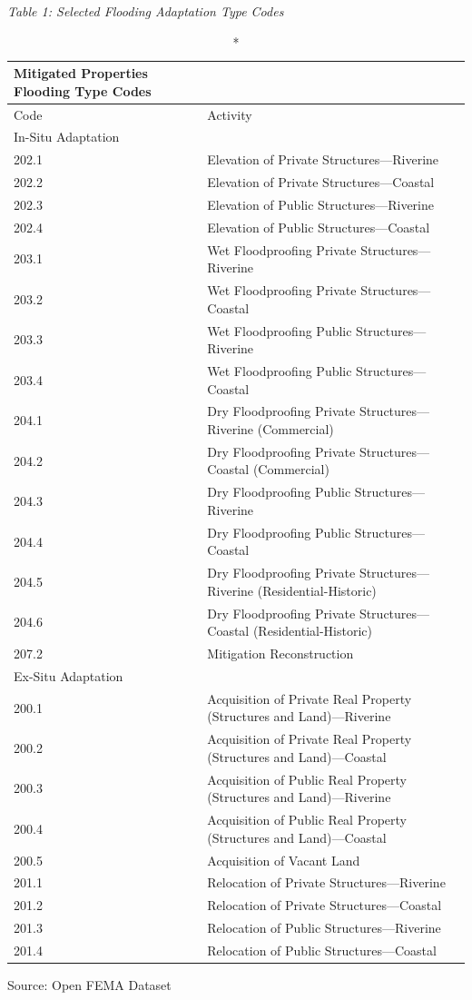 \documentclass[
  12pt,
]{article}
\begin{document}
\newpage

\emph{Table 1: Selected Flooding Adaptation Type Codes}

\captionsetup[table]{labelformat=empty,skip=1pt}
\setlength{\LTpost}{0mm}
\begin{longtable}{ll}
\caption*{
{\large Mitigated Properties Flooding Type Codes}
} \\ 
\toprule
Code & Activity \\ 
\midrule
\multicolumn{1}{l}{In-Situ Adaptation} \\ 
\midrule
202.1 & Elevation of Private Structures—Riverine \\ 
202.2 & Elevation of Private Structures—Coastal \\ 
202.3 & Elevation of Public Structures—Riverine \\ 
202.4 & Elevation of Public Structures—Coastal \\ 
203.1 & Wet Floodproofing Private Structures—Riverine \\ 
203.2 & Wet Floodproofing Private Structures—Coastal \\ 
203.3 & Wet Floodproofing Public Structures—Riverine \\ 
203.4 & Wet Floodproofing Public Structures—Coastal \\ 
204.1 & Dry Floodproofing Private Structures—Riverine (Commercial) \\ 
204.2 & Dry Floodproofing Private Structures—Coastal (Commercial) \\ 
204.3 & Dry Floodproofing Public Structures—Riverine \\ 
204.4 & Dry Floodproofing Public Structures—Coastal \\ 
204.5 & Dry Floodproofing Private Structures—Riverine (Residential-Historic) \\ 
204.6 & Dry Floodproofing Private Structures—Coastal (Residential-Historic) \\ 
207.2 & Mitigation Reconstruction \\ 
\midrule
\multicolumn{1}{l}{Ex-Situ Adaptation} \\ 
\midrule
200.1 & Acquisition of Private Real Property (Structures and Land)—Riverine \\ 
200.2 & Acquisition of Private Real Property (Structures and Land)—Coastal \\ 
200.3 & Acquisition of Public Real Property (Structures and Land)—Riverine \\ 
200.4 & Acquisition of Public Real Property (Structures and Land)—Coastal \\ 
200.5 & Acquisition of Vacant Land \\ 
201.1 & Relocation of Private Structures—Riverine \\ 
201.2 & Relocation of Private Structures—Coastal \\ 
201.3 & Relocation of Public Structures—Riverine \\ 
201.4 & Relocation of Public Structures—Coastal \\ 
\bottomrule
\end{longtable}
\begin{minipage}{\linewidth}
Source: Open FEMA Dataset\\
\end{minipage}
\end{document}
